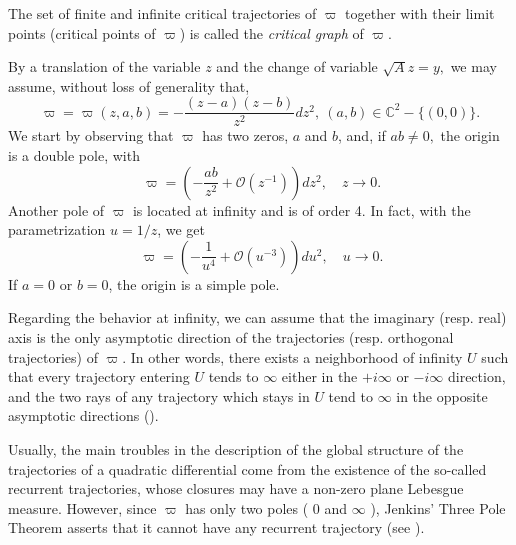 \documentclass[12pt]{amsart}
\begin{document}
The set of finite and infinite critical trajectories of $\varpi $ together
with their limit points (critical points of $\varpi $) is called the \emph{critical graph} of $\varpi $.

By a translation of the variable $z$ and the change of variable $\sqrt{A}z=y, $ we may assume, without loss of generality that, 
\begin{equation*}
\varpi =\varpi \left( z,a,b\right) =-\frac{\left( z-a\right) \left(
z-b\right) }{z^{2}}dz^{2},\ (a,b)\in 
\mathbb{C}
^{2}-\{(0,0)\}.
\end{equation*}We start by observing that $\varpi $ has two zeros, $a$ and $b$, and, if $ab\neq 0,$ the origin is a double pole, with 
\begin{equation*}
\ \varpi =\left( -\frac{ab}{z^{2}}+\mathcal{O}(z^{-1})\right) dz^{2},\quad
z\rightarrow 0.
\end{equation*}Another pole of $\varpi $ is located at infinity and is of order 4. In fact,
with the parametrization $u=1/z$, we get 
\begin{equation*}
\ \varpi =\left( -\frac{1}{u^{4}}+\mathcal{O}(u^{-3})\right) du^{2},\quad
u\rightarrow 0.
\end{equation*}If $a=0$ or $b=0$, the origin is a simple pole.\newline

Regarding the behavior at infinity, we can assume that the imaginary (resp.
real) axis is the only asymptotic direction of the trajectories (resp.
orthogonal trajectories) of $\varpi $. In other words, there exists a
neighborhood of infinity $U$ such that every trajectory entering $U$ tends
to $\infty $ either in the $+i\infty $ or $-i\infty $ direction, and the two
rays of any trajectory which stays in $U$ tend to $\infty $ in the opposite
asymptotic directions (\cite[Theorem 7.4]{Strebel:84}).

Usually, the main troubles in the description of the global structure of the
trajectories of a quadratic differential come from the existence of the
so-called recurrent trajectories, whose closures may have a non-zero plane
Lebesgue measure. However, since $\varpi $ has only two poles ( $0$ and $\infty $ ), Jenkins' Three Pole Theorem asserts that it cannot have any
recurrent trajectory (see \cite[Theorem 15.2]{Strebel:84}).\bigskip
\end{document}
